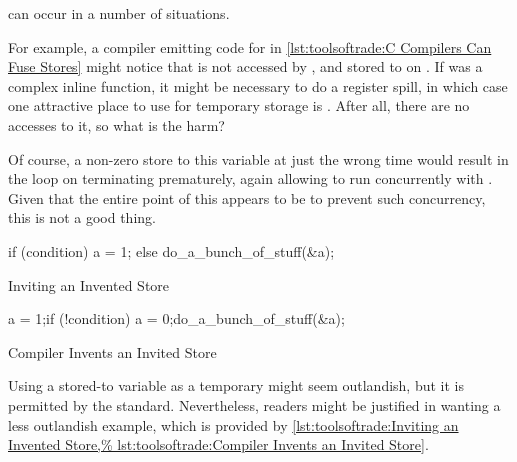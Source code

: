 \begin{description}[labelsep=.4em]
\item[Invented stores] can occur in a number of situations.
\begin{fcvref}
For example, a compiler emitting code for  in
\cref{lst:toolsoftrade:C Compilers Can Fuse Stores}
might notice that  is not accessed by
, and stored to on .
If  was a complex inline function, it might be
necessary to do a register spill, in which case one attractive
place to use for temporary storage is .
After all, there are no accesses to it, so what is the harm?

Of course, a non-zero store to this variable at just the wrong time
would result in the  loop on
 terminating
prematurely, again allowing  to run
concurrently with .
Given that the entire point of this  appears to be to
prevent such concurrency, this is not a good thing.
\end{fcvref}

\begin{listing}
\begin{fcvlabel}
\begin{VerbatimLL}[commandchars=\\\{\}]
if (condition)
	a = 1;
else
	do_a_bunch_of_stuff(&a);
\end{VerbatimLL}
\end{fcvlabel}
\caption{Inviting an Invented Store}
\label{lst:toolsoftrade:Inviting an Invented Store}
\end{listing}

\begin{listing}
\begin{fcvlabel}
\begin{VerbatimLL}[commandchars=\\\[\]]
a = 1;
if (!condition) {
	a = 0;
	do_a_bunch_of_stuff(&a);
}
\end{VerbatimLL}
\end{fcvlabel}
\caption{Compiler Invents an Invited Store}
\label{lst:toolsoftrade:Compiler Invents an Invited Store}
\end{listing}

Using a stored-to variable as a temporary might seem outlandish,
but it is permitted by the standard.
Nevertheless, readers might be justified in wanting a less
outlandish example, which is provided by
\cref{lst:toolsoftrade:Inviting an Invented Store,%
lst:toolsoftrade:Compiler Invents an Invited Store}.


\end{description}

